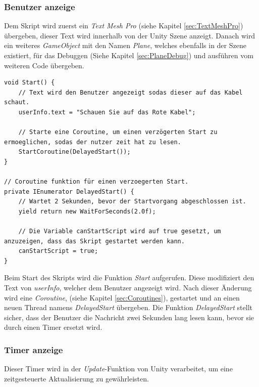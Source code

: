 \subsubsection*{Benutzer anzeige}
Dem Skript wird zuerst ein \textit{Text Mesh Pro} (siehe Kapitel \ref{sec:TextMeshPro}) übergeben, dieser Text wird innerhalb von der Unity Szene anzeigt. Danach wird ein weiteres \textit{GameObject} mit den Namen \textit{Plane}, welches ebenfalls in der Szene existiert, für das Debuggen (Siehe Kapitel \ref{sec:PlaneDebug}) und ausführen vom weiteren Code übergeben.
\begin{lstlisting}[style=csharp, caption={Start des \textit{CableSearch} Skripts}, label=code:CableSearch]
void Start() {
    // Text wird den Benutzer angezeigt sodas dieser auf das Kabel schaut.
    userInfo.text = "Schauen Sie auf das Rote Kabel";

    // Starte eine Coroutine, um einen verzögerten Start zu ermoeglichen, sodas der nutzer zeit hat zu lesen.
    StartCoroutine(DelayedStart());
}

// Coroutine funktion für einen verzoegerten Start.
private IEnumerator DelayedStart() {
    // Wartet 2 Sekunden, bevor der Startvorgang abgeschlossen ist.
    yield return new WaitForSeconds(2.0f);

    // Die Variable canStartScript wird auf true gesetzt, um anzuzeigen, dass das Skript gestartet werden kann.
    canStartScript = true;
}
\end{lstlisting}
Beim Start des Skripts wird die Funktion \textit{Start} aufgerufen. Diese modifiziert den Text von \textit{userInfo}, welcher dem Benutzer angezeigt wird. Nach dieser Änderung wird eine \textit{Coroutine}, (siehe Kapitel \ref{sec:Coroutines}), gestartet und an einen neuen Thread namens \textit{DelayedStart} übergeben. Die Funktion \textit{DelayedStart} stellt sicher, dass der Benutzer die Nachricht zwei Sekunden lang lesen kann, bevor sie durch einen Timer ersetzt wird.
\subsubsection*{Timer anzeige}
Dieser Timer wird in der \textit{Update}-Funktion von Unity verarbeitet, um eine zeitgesteuerte Aktualisierung zu gewährleisten.

